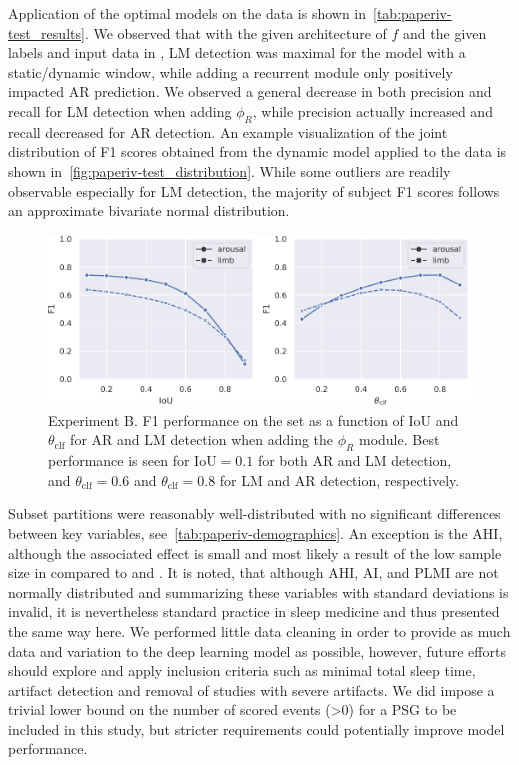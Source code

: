 Application of the optimal models on the \test{} data is shown in~\cref{tab:paperiv-test_results}. We observed that with the given architecture of $f$ and the given labels and input data in \train{}, LM detection was maximal for the model with a static/dynamic window, while adding a recurrent module only positively impacted AR prediction. We observed a general decrease in both precision and recall for LM detection when adding $\phi_{R}$, while precision actually increased and recall decreased for AR detection. An example visualization of the joint distribution of F1 scores obtained from the dynamic model applied to the \test{} data is shown in~\cref{fig:paperiv-test_distribution}. While some outliers are readily observable especially for LM detection, the majority of subject F1 scores follows an approximate bivariate normal distribution.

\begin{figure}
    \centering
    \includegraphics[width=\columnwidth]{figures/paper-iv/embc19-mros-arousal_limb-all_durations_rnn.pdf}
    \caption[MSEDv1 Experiment B results]{Experiment B. F1 performance on the \eval{} set as a function of IoU and $\theta_{\mathrm{clf}}$ for AR and LM detection when adding the $\phi_{R}$ module. Best performance is seen for $\mathrm{IoU}=0.1$ for both AR and LM detection, and $\theta_{\mathrm{clf}} = 0.6$ and $\theta_{\mathrm{clf}}=0.8$ for LM and AR detection, respectively.}
    \label{fig:paperiv-experiment_b}
\end{figure}

Subset partitions were reasonably well-distributed with no significant differences between key variables, see~\cref{tab:paperiv-demographics}. An exception is the AHI, although the associated effect is small and most likely a result of the low sample size in \eval{} compared to \train{} and \test{}. It is noted, that although AHI, AI, and PLMI are not normally distributed and summarizing these variables with standard deviations is invalid, it is nevertheless standard practice in sleep medicine and thus presented the same way here. We performed little data cleaning in order to provide as much data and variation to the deep learning model as possible, however, future efforts should explore and apply inclusion criteria such as minimal total sleep time, artifact detection and removal of studies with severe artifacts. We did impose a trivial lower bound on the number of scored events (>0) for a \ac{PSG} to be included in this study, but stricter requirements could potentially improve model performance.

